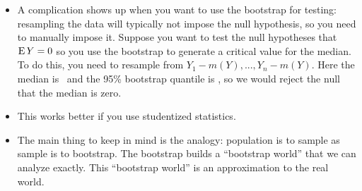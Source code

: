 \begin{itemize}[leftmargin=0pt]

\item A complication shows up when you want to use the bootstrap for
  testing: resampling the data will typically not impose the null
  hypothesis, so you need to manually impose it.  Suppose you want to
  test the null hypotheses that $\operatorname{E} Y = 0$ so you use the bootstrap to
  generate a critical value for the median.  To do this, you need to
  resample from $Y_1 - m(Y),...,Y_n - m(Y)$.
  \renewcommand*\FancyVerbStartString{## block 5}
  Here the median is \ymedian\ and the 95\% bootstrap quantile is
  \bootinference, so we would reject the null that the median is zero.

\item This works better if you use studentized statistics.
  
\item The main thing to keep in mind is the analogy: population is to
  sample as sample is to bootstrap.  The bootstrap builds a
  ``bootstrap world'' that we can analyze exactly.  This ``bootstrap
  world'' is an approximation to the real world.

\end{itemize}

